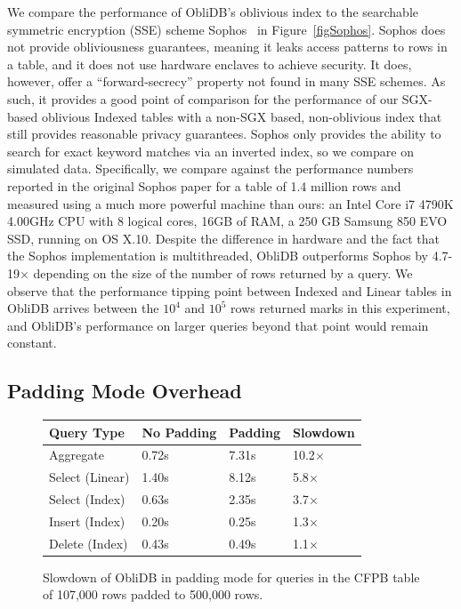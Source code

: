 \documentclass[letterpaper,twocolumn,10pt]{article}
\def\name/{ObliDB}
\begin{document}
We compare the performance of \name/'s oblivious index to the searchable symmetric encryption (SSE) scheme Sophos~\cite{Bost16} in Figure~\ref{figSophos}. Sophos does not provide obliviousness guarantees, meaning it leaks access patterns to rows in a table, and it does not use hardware enclaves to achieve security. It does, however, offer a ``forward-secrecy'' property not found in many SSE schemes. As such, it provides a good point of comparison for the performance of our SGX-based oblivious Indexed tables with a non-SGX based, non-oblivious index that still provides reasonable privacy guarantees. Sophos only provides the ability to search for exact keyword matches via an inverted index, so we compare on simulated data. Specifically, we compare against the performance numbers reported in the original Sophos paper for a table of 1.4 million rows and measured using a much more powerful machine than ours: an Intel Core i7 4790K 4.00GHz CPU with 8 logical cores, 16GB of RAM, a 250 GB Samsung 850 EVO SSD, running on OS X.10. Despite the difference in hardware and the fact that the Sophos implementation is multithreaded, \name/ outperforms Sophos by 4.7-19$\times$ depending on the size of the number of rows returned by a query. We observe that the performance tipping point between Indexed and Linear tables in \name/ arrives between the $10^4$ and $10^5$ rows returned marks in this experiment, and \name/'s performance on larger queries beyond that point would remain constant.

\subsection{Padding Mode Overhead}
\begin{figure}
\small
\centering
\begin{tabular}{llll}
\textbf{Query Type} & \textbf{No Padding} & \textbf{Padding} & \textbf{Slowdown} \\\hline
Aggregate & 0.72s & 7.31s & 10.2$\times$\\
Select (Linear) & 1.40s & 8.12s & 5.8$\times$\\
Select (Index) & 0.63s & 2.35s & 3.7$\times$\\
Insert (Index) & 0.20s & 0.25s & 1.3$\times$\\
Delete (Index) & 0.43s & 0.49s & 1.1$\times$\\
\end{tabular}
\caption{Slowdown of \name/ in padding mode for queries in the CFPB table of 107,000 rows padded to 500,000 rows.}
\label{figPad}
\end{figure}
\end{document}

